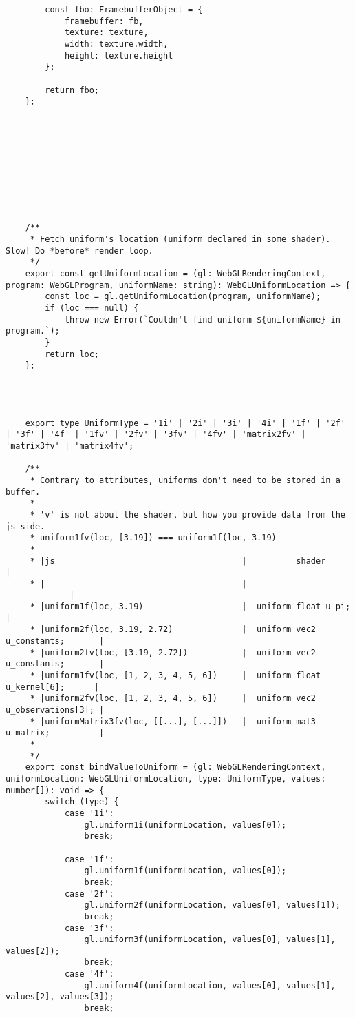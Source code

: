 {\begin{lstlisting}
        const fbo: FramebufferObject = {
            framebuffer: fb,
            texture: texture,
            width: texture.width,
            height: texture.height
        };
    
        return fbo;
    };
    
    
    
    
    
    
    
    
    
    
    /**
     * Fetch uniform's location (uniform declared in some shader). Slow! Do *before* render loop.
     */
    export const getUniformLocation = (gl: WebGLRenderingContext, program: WebGLProgram, uniformName: string): WebGLUniformLocation => {
        const loc = gl.getUniformLocation(program, uniformName);
        if (loc === null) {
            throw new Error(`Couldn't find uniform ${uniformName} in program.`);
        }
        return loc;
    };
    
    
    
    
    export type UniformType = '1i' | '2i' | '3i' | '4i' | '1f' | '2f' | '3f' | '4f' | '1fv' | '2fv' | '3fv' | '4fv' | 'matrix2fv' | 'matrix3fv' | 'matrix4fv';
    
    /**
     * Contrary to attributes, uniforms don't need to be stored in a buffer.
     *
     * 'v' is not about the shader, but how you provide data from the js-side.
     * uniform1fv(loc, [3.19]) === uniform1f(loc, 3.19)
     *
     * |js                                      |          shader                  |
     * |----------------------------------------|----------------------------------|
     * |uniform1f(loc, 3.19)                    |  uniform float u_pi;             |
     * |uniform2f(loc, 3.19, 2.72)              |  uniform vec2 u_constants;       |
     * |uniform2fv(loc, [3.19, 2.72])           |  uniform vec2 u_constants;       |
     * |uniform1fv(loc, [1, 2, 3, 4, 5, 6])     |  uniform float u_kernel[6];      |
     * |uniform2fv(loc, [1, 2, 3, 4, 5, 6])     |  uniform vec2 u_observations[3]; |
     * |uniformMatrix3fv(loc, [[...], [...]])   |  uniform mat3 u_matrix;          |
     *
     */
    export const bindValueToUniform = (gl: WebGLRenderingContext, uniformLocation: WebGLUniformLocation, type: UniformType, values: number[]): void => {
        switch (type) {
            case '1i':
                gl.uniform1i(uniformLocation, values[0]);
                break;
    
            case '1f':
                gl.uniform1f(uniformLocation, values[0]);
                break;
            case '2f':
                gl.uniform2f(uniformLocation, values[0], values[1]);
                break;
            case '3f':
                gl.uniform3f(uniformLocation, values[0], values[1], values[2]);
                break;
            case '4f':
                gl.uniform4f(uniformLocation, values[0], values[1], values[2], values[3]);
                break;
    

\end{lstlisting}}

